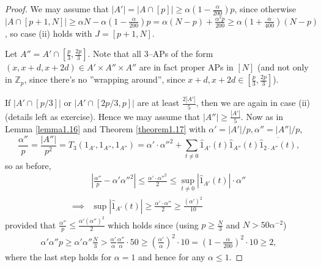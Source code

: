 \documentclass{article}
\theoremstyle{definition}
\begin{document}
\begin{proof}
    We may assume that $|A'| = |A \cap [p]| \ge \alpha \left(1-\frac{\alpha}{200}\right)p$, since otherwise $|A \cap [p+1, N]| \ge \alpha N - \alpha\left(1-\frac{\alpha}{200}\right)p = \alpha(N-p) + \frac{\alpha^2p}{200} \ge \alpha \left(1 + \frac{\alpha}{400}\right) (N-p)$, so case (ii) holds with $J = [p+1,N]$.
    \vspace{1mm}
     
    Let $A'' = A' \cap \left[\frac{p}{3},\frac{2p}{3}\right]$. Note that all 3--APs of the form $(x,x+d,x+2d) \in A' \times A'' \times A''$ are in fact proper APs  in $[N]$ (and not only in $\mathbb{Z}_p$, since there's no ''wrapping around'', since $x+d, x+2d \in \left[ \frac{p}{3}, \frac{2p}{3}\right]$). 
    \vspace{1mm}
     
    If $\left|A' \cap \left[p/3\right]\right|$ or $\left|A' \cap \left[2p/3, p \right]\right|$ are at least $\frac{2|A'|}{5}$, then we are again in case (ii) (details left as exercise). Hence we may assume that $|A''|\ge \frac{|A'|}{5}$. Now as in Lemma \ref{lemma1.16} and Theorem \ref{theorem1.17} with $\alpha' = |A'|/p, \alpha'' = |A''|/p$, \[
    \frac{\alpha''}{p} = \frac{|A''|}{p^2} = T_3(1_{A'},1_{A''},1_{A''}) = \alpha' \cdot \alpha''^2 + \sum_{t \neq 0}^{} \hat{1}_{A'}(t)\hat{1}_{A''}(t)\overline{\hat{1}_{2\cdot A''}(t)},
    \]
    so as before, 
    \begin{align*}
        &\left|\frac{\alpha''}{p}- \alpha' \alpha''^2 \right| \le \frac{\alpha' \cdot \alpha''^2}{2} \le \sup_{t \neq 0}|\hat{1}_{A'}(t)|\cdot \alpha'' \\
        \implies & \sup|\hat{1}_{A'}(t)|\ge \frac{\alpha' \cdot \alpha''}{2} \ge \frac{(\alpha')^2}{10}
    \end{align*}
    provided that $\frac{\alpha''}{p}\le \frac{\alpha'(\alpha'')^2}{2}$ which holds since (using $p\ge \frac{N}{3}$ and $N > 50\alpha^{-2}$)
    \begin{align*}
        \alpha' \alpha'' p \ge \alpha' \alpha'' \frac{N}{3} > \frac{\alpha'}{\alpha}\frac{\alpha''}{\alpha}\cdot  50 \ge \left(\frac{\alpha'}{\alpha}\right)^2\cdot  10 = \left(1-\frac{\alpha}{200}\right)^2 \cdot 10 \ge 2,
    \end{align*}
    where the last step holds for $\alpha=1$ and hence for any $\alpha\le 1$.
\end{proof}
\end{document}
